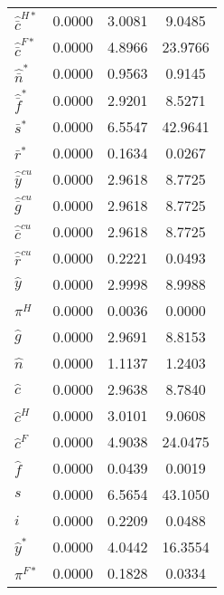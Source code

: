 \begin{center}
\begin{longtable}{lccc}
${\hat {\bar c}^{H*}}  $	 & 	       0.0000	 & 	       3.0081	 & 	       9.0485 \\ 
${\hat {\bar c}^{F*}}  $	 & 	       0.0000	 & 	       4.8966	 & 	      23.9766 \\ 
${\hat {\bar n}^*}     $	 & 	       0.0000	 & 	       0.9563	 & 	       0.9145 \\ 
${\hat {\bar f}^*}     $	 & 	       0.0000	 & 	       2.9201	 & 	       8.5271 \\ 
${\bar s^*}            $	 & 	       0.0000	 & 	       6.5547	 & 	      42.9641 \\ 
${\bar r^*}            $	 & 	       0.0000	 & 	       0.1634	 & 	       0.0267 \\ 
${\hat {\bar y}^{cu}}  $	 & 	       0.0000	 & 	       2.9618	 & 	       8.7725 \\ 
${\hat {\bar g}^{cu}}  $	 & 	       0.0000	 & 	       2.9618	 & 	       8.7725 \\ 
${\hat {\bar c}^{cu}}  $	 & 	       0.0000	 & 	       2.9618	 & 	       8.7725 \\ 
${\hat {\bar r}^{cu}}  $	 & 	       0.0000	 & 	       0.2221	 & 	       0.0493 \\ 
${\hat y}              $	 & 	       0.0000	 & 	       2.9998	 & 	       8.9988 \\ 
${\pi^H}               $	 & 	       0.0000	 & 	       0.0036	 & 	       0.0000 \\ 
${\hat g}              $	 & 	       0.0000	 & 	       2.9691	 & 	       8.8153 \\ 
${\hat n}              $	 & 	       0.0000	 & 	       1.1137	 & 	       1.2403 \\ 
${\hat c}              $	 & 	       0.0000	 & 	       2.9638	 & 	       8.7840 \\ 
${\hat c^H}            $	 & 	       0.0000	 & 	       3.0101	 & 	       9.0608 \\ 
${\hat c^F}            $	 & 	       0.0000	 & 	       4.9038	 & 	      24.0475 \\ 
${\hat f}              $	 & 	       0.0000	 & 	       0.0439	 & 	       0.0019 \\ 
${s}                   $	 & 	       0.0000	 & 	       6.5654	 & 	      43.1050 \\ 
${i}                   $	 & 	       0.0000	 & 	       0.2209	 & 	       0.0488 \\ 
${\hat y^*}            $	 & 	       0.0000	 & 	       4.0442	 & 	      16.3554 \\ 
${\pi^{F*}}            $	 & 	       0.0000	 & 	       0.1828	 & 	       0.0334 \\ 

\end{longtable}
\end{center}
